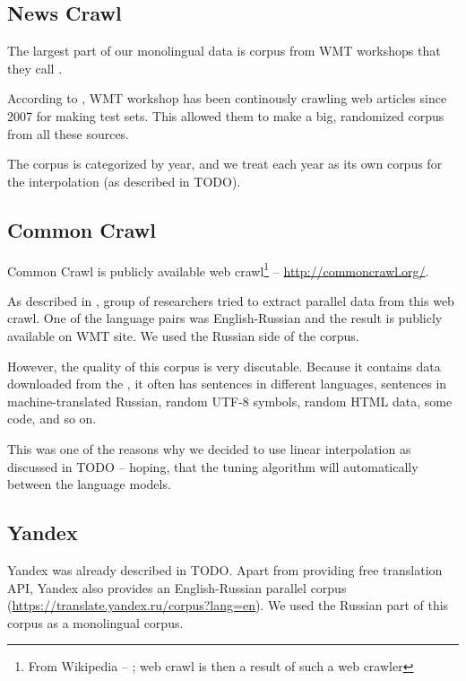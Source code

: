 \subsection{News Crawl}
The largest part of our monolingual data is corpus from WMT workshops that they call .

According to \cite{wmt_findings_2009}, WMT workshop has been continously crawling web articles since 2007 for making test sets. This allowed them to make a big, randomized corpus from all these sources.

The corpus is categorized by year, and we treat each year as its own corpus for the interpolation (as described in TODO).%
\subsection{Common Crawl}
Common Crawl is publicly available web crawl\footnote{From Wikipedia -- ; web crawl is then a result of such a web crawler} -- \url{http://commoncrawl.org/}.

As described in \cite{commoncrawl}, group of researchers tried to extract parallel data from this web crawl. One of the language pairs was English-Russian and the result is publicly available on WMT site. We used the Russian side of the corpus.

However, the quality of this corpus is very discutable. Because it contains data downloaded from the , it often has sentences in different languages, sentences in machine-translated Russian, random UTF-8 symbols, random HTML data, some code, and so on.

This was one of the reasons why we decided to use linear interpolation as discussed in 
TODO %
-- hoping, that the tuning algorithm will automatically  between the language models.
\subsection{Yandex}
Yandex was already described in 
TODO. %
Apart from providing free translation API, Yandex also provides an English-Russian parallel corpus (\url{https://translate.yandex.ru/corpus?lang=en}). We used the Russian part of this corpus as a monolingual corpus.

